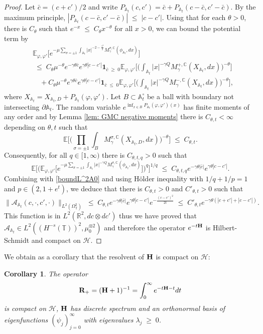 \documentclass[11pt]{amsart}
\numberwithin{equation}{section}
\newtheorem{corollary}[theorem]{Corollary}
\theoremstyle{definition}
\renewcommand{\leq}{\;\leqslant\;}                   %
\renewcommand{\geq}{\;\geqslant\;}                   %
\newcommand{\C}{\mathbb{C}}
\newcommand{\A}{\mathbb{A}}
\renewcommand{\H}{\mathbb{H}}
\newcommand{\R}{\mathbb{R}}
\def\H{\mathbf{H}}
\def\bR{\mathbf{R}}
\def\E{\mathbb{E}}
\newcommand{\pl}{\partial}
\newcommand{\mc}{\mathcal}
\newcommand{\la}{\lambda}
\def\T{\mathbb{T}}
\begin{document}
\begin{proof}
Let $\bar{c}=(c+c')/2$ and write $P_{\A_t}(c,c')=\bar{c}+P_{\A_t}(c-\bar{c},c'-\bar{c})$. By the maximum principle, 
$|P_{\A_t}(c-\bar{c},c'-\bar{c})|\leq |c-c'|$. 
Using that for each $\theta>0$, there is $C_\theta$ such that $e^{-x}\leq C_\theta x^{-\theta}$ for all $x>0$, 
we can bound the potential term by
\begin{align*}
& \E_{\varphi,\varphi'}\Big[e^{-\mu \sum_{\sigma=\pm 1}\int_{\A_t}|x|^{-2-\frac{\gamma^2}{2}}
M_{\gamma}^{\sigma,\C}(\phi_{\A_t},dx)}\Big]\\
& \leq 
C_\theta \mu^{-\theta }e^{-\gamma \theta \bar{c}} e^{\gamma \theta |c-c'|}\textbf{1}_{\bar{c}\geq 0}\E_{\varphi,\varphi'}\Big[\Big(\int_{\A_t}|x|^{-\gamma Q} M_{\gamma}^{+,\C}(X_{\A_t},dx)\Big)^{-\theta }\Big]\\
& \quad +C_\theta\mu^{-\theta}e^{\gamma \theta \bar{c}} e^{\gamma \theta|c-c'|}\textbf{1}_{\bar{c}\leq 0}\E_{\varphi,\varphi'}\Big[\Big(\int_{\A_t}|x|^{-\gamma Q} M_{\gamma}^{-,\C}(X_{\A_t},dx)\Big)^{-\theta}\Big],
\end{align*}
where $X_{\A_t}=X_{\A_t,D}+P_{\A_t}(\varphi,\varphi')$. Let $B\subset \A_t^\circ $ be a ball with boundary 
not intersecting $\pl \A_t$. The random variable $e^{\inf_{x\in B}P_{\A_t}(\varphi,\varphi')(x)}$ has finite moments of any order and by Lemma \ref{lem: GMC negative moments}  there is $C_{\theta,t}<\infty$ depending on $\theta,t$ such that 
\[\E \Big[\Big(\prod_{\sigma=\pm 1}\int_{B} M_{\gamma}^{\sigma,\C}(X_{\A_t,D},dx)\Big)^{-\theta}\Big]\leq C_{\theta,t}.\]
Consequently, for all $q\in [1,\infty)$ there is $C_{\theta,t,q}>0$ such that 
\[ \E\Big[ \Big(\E_{\varphi,\varphi'}\Big[e^{-\mu \sum_{\sigma=\pm 1}\int_{\A_t}|x|^{-\gamma Q}
M_{\gamma}^{\sigma,\C}(\phi_{\A_t},dx)}\Big]\Big)^q\Big]^{1/q} \leq C_{\theta,t,q}e^{-\gamma \theta |\bar{c}|}e^{\gamma \theta |c-c'|}.\]
Combining with \eqref{boundL^2A0} and using H\"older inequality with $1/q+1/p=1$ and $p\in (2,1+e^{t})$, we deduce that
there is $C_{\theta,t}>0$ and $C'_{\theta,t}>0$ such that
\[ \|\mc{A}_{\A_t}(c,\cdot,c',\cdot)\|_{L^2(\Omega_\T^2)}\leq C_{\theta,t} e^{-\gamma \theta |\bar{c}|}e^{\gamma \theta|c-c'|}e^{-\frac{(c-c')^2}{2t}}\leq  C'_{\theta,t} e^{-\gamma \theta  (|c+c'|+|c-c'|)}.\]
This function is in $L^2(\R^2,dc\otimes dc')$ thus we have proved that $\mc{A}_{\A_t}\in L^2((H^{-s}(\T))^2,\mu_0^{\otimes 2})$ and therefore the operator $e^{-t{\bf H}}$ is Hilbert-Schmidt and compact on $\mc{H}$.
\end{proof}
We obtain as a corollary that the resolvent of ${\bf H}$ is compact on $\mc{H}$:
\begin{corollary}\label{compact_resolvent}
The operator 
\[\bR_+=({\bf H}+1)^{-1}=\int_0^\infty e^{-t\H -t} dt\]
is compact on $\mc{H}$, ${\bf H}$ has discrete spectrum and an orthonormal basis of eigenfunctions $(\psi_j)_{j=0}^\infty$ with eigenvalues $\la_j\geq 0$.
\end{corollary}
\end{document}
